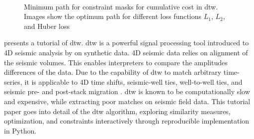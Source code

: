 \begin{figure}[!hb]
    ~
    ~
\caption{Minimum path for constraint masks for cumulative cost in \ac{dtw}. Images show the optimum path for different loss functions $L_1$, $L_2$, and Huber loss \citep[from][]{dramsch2019dtw}}
\label{fig:constraints}
\end{figure} 
\citet{dramsch2019dtw} presents a tutorial of \acf{dtw}. \ac{dtw} is a powerful signal processing tool introduced to 4D seismic analysis by \citep{Hale2013} on synthetic data. 4D seismic data relies on alignment of the seismic volumes. This enables interpreters to compare the amplitudes differences of the data. Due to the capability of \ac{dtw} to match arbitrary time-series, it is applicable to 4D time shifts, seismic-well ties, well-to-well ties, and seismic pre- and post-stack migration \citep{Luo*2014}.  \ac{dtw} is known to be computationally slow and expensive, while extracting poor matches on seismic field data. This tutorial paper goes into detail of the \ac{dtw} algorithm, exploring similarity measures, optimization, and constraints interactively through reproducible implementation in Python.

